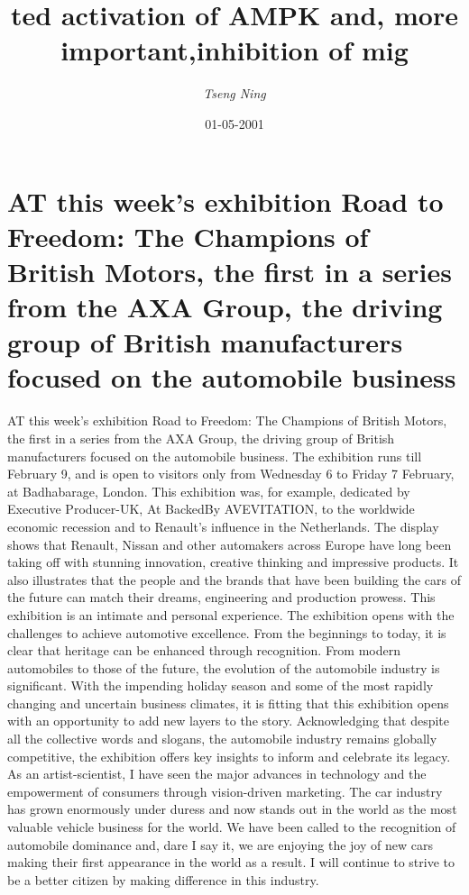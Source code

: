 \documentclass{article}%
\title{ted activation of AMPK and, more important,inhibition of mig}%
\author{\textit{Tseng Ning}}%
\date{01-05-2001}%
\begin{document}
%
\normalsize%
\maketitle%
\section{AT this week's exhibition Road to Freedom: The Champions of British Motors, the first in a series from the AXA Group, the driving group of British manufacturers focused on the automobile business}%
\label{sec:ATthisweeksexhibitionRoadtoFreedomTheChampionsofBritishMotors,thefirstinaseriesfromtheAXAGroup,thedrivinggroupofBritishmanufacturersfocusedontheautomobilebusiness}%
AT this week's exhibition Road to Freedom: The Champions of British Motors, the first in a series from the AXA Group, the driving group of British manufacturers focused on the automobile business. The exhibition runs till February 9, and is open to visitors only from Wednesday 6 to Friday 7 February, at Badhabarage, London.\newline%
This exhibition was, for example, dedicated by Executive Producer{-}UK, At BackedBy AVEVITATION, to the worldwide economic recession and to Renault's influence in the Netherlands. The display shows that Renault, Nissan and other automakers across Europe have long been taking off with stunning innovation, creative thinking and impressive products. It also illustrates that the people and the brands that have been building the cars of the future can match their dreams, engineering and production prowess.\newline%
This exhibition is an intimate and personal experience. The exhibition opens with the challenges to achieve automotive excellence. From the beginnings to today, it is clear that heritage can be enhanced through recognition. From modern automobiles to those of the future, the evolution of the automobile industry is significant.\newline%
With the impending holiday season and some of the most rapidly changing and uncertain business climates, it is fitting that this exhibition opens with an opportunity to add new layers to the story. Acknowledging that despite all the collective words and slogans, the automobile industry remains globally competitive, the exhibition offers key insights to inform and celebrate its legacy.\newline%
As an artist{-}scientist, I have seen the major advances in technology and the empowerment of consumers through vision{-}driven marketing. The car industry has grown enormously under duress and now stands out in the world as the most valuable vehicle business for the world. We have been called to the recognition of automobile dominance and, dare I say it, we are enjoying the joy of new cars making their first appearance in the world as a result. I will continue to strive to be a better citizen by making difference in this industry.\newline%
\end{document}
